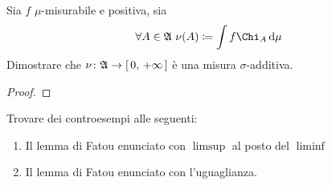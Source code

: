 \documentclass[../EserciziIstituzioniAnalisi.tex]{subfiles}
\begin{document}
\begin{exercise}[28/10/2017]
  Sia $f$ $\mu$-misurabile e positiva, sia
  \begin{equation*}
    \forall A \in \gA\ \nu(A)\coloneqq \int f \Chi_A \de \mu
  \end{equation*}
  Dimostrare che $\nu\colon\mathfrak A\rightarrow \left[\,0,\,+\infty\,\right]$ è una misura $\sigma$-additiva.
\end{exercise}
\begin{proof}
  
\end{proof}
\begin{exercise}[3/11/2016]
  Trovare dei controesempi alle seguenti:
  \begin{enumerate}
    \item Il lemma di Fatou enunciato con $\limsup$ al posto del $\liminf$
    \item Il lemma di Fatou enunciato con l'uguaglianza.
  \end{enumerate}
\end{exercise}
\end{document}
